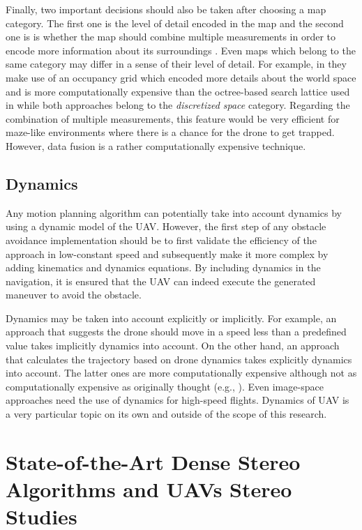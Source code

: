 Finally, two important decisions should also be taken after choosing a map category. The first one is the level of detail encoded in the map and the second one is is whether the map should combine multiple measurements in order to encode more information about its surroundings \cite{Dijk}. Even maps which belong to the same category may differ in a sense of their level of detail. For example, in \cite{Barry2018} they make use of an occupancy grid which encoded more details about the world space and is more computationally expensive than the octree-based search lattice used in \cite{Xu2015} while both approaches belong to the \textit{discretized space} category. Regarding the combination of multiple measurements, this feature would be very efficient for maze-like environments where there is a chance for the drone to get trapped. However, data fusion is a rather computationally expensive technique.

\subsection{Dynamics}

Any motion planning algorithm can potentially take into account dynamics by using a dynamic model of the \ac{UAV}. However, the first step of any obstacle avoidance implementation should be to first validate the efficiency of the approach in low-constant speed and subsequently make it more complex by adding kinematics and dynamics equations. By including dynamics in the navigation, it is ensured that the \ac{UAV} can indeed execute the generated maneuver to avoid the obstacle.

Dynamics may be taken into account explicitly or implicitly. For example, an approach that suggests the drone should move in a speed less than a predefined value takes implicitly dynamics into account. On the other hand, an approach that calculates the trajectory based on drone dynamics takes explicitly dynamics into account. The latter ones are more computationally expensive although not as computationally expensive as originally thought (e.g., \cite{Fragoso2017}). Even image-space approaches need the use of dynamics for high-speed flights. Dynamics of \ac{UAV} is a very particular topic on its own and outside of the scope of this research.

\section{State-of-the-Art Dense Stereo Algorithms and UAVs Stereo Studies}
\label{ch:literature:obstacle_avoidance:state_of_the_art_stereo}


